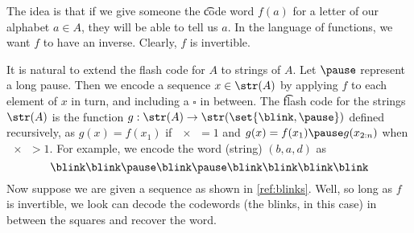 The idea is that if we give someone the \t{code word} $f(a)$ for a letter of our alphabet $a \in A$, they will be able to tell us $a$.
In the language of functions, we want $f$ to have an inverse.
Clearly, $f$ is invertible.

It is natural to extend the flash code for $A$ to strings of $A$.
Let $\pause$ represent a long pause.
Then we encode a sequence $x \in \str(A)$ by applying $f$ to each element of $x$ in turn, and including a $\square$ in between.
The \t{flash code} for the strings $\str(A)$ is the function $g: \str(A) \to \str(\set{\blink, \pause})$ defined recursively, as $g(x) = f(x_1)$ if $\num{x} = 1$ and $g(x) = f(x_1)\pause g(x_{2:n})$ when $\num{x} > 1$.
For example, we encode the word (string) $(b,a,d)$ as
\begin{equation}
  \label{ref:blinks}\blink
\blink
\pause
\blink
\pause
\blink
\blink
\blink
\blink\end{equation}
Now suppose we are given a sequence as shown in \eqref{ref:blinks}.
Well, so long as $f$ is invertible, we look can decode the codewords (the blinks, in this case) in between the squares and recover the word.
